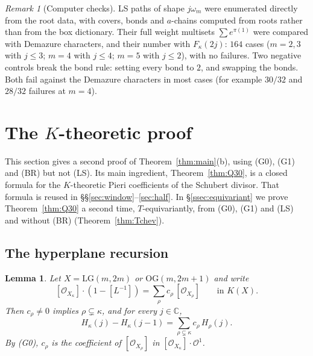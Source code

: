 \documentclass[11pt]{amsart}
\newtheorem{lemma}[theorem]{Lemma}
\theoremstyle{definition}
\theoremstyle{remark}
\newtheorem{remark}[theorem]{Remark}
\newcommand{\LG}{\mathrm{LG}}
\newcommand{\OG}{\mathrm{OG}}
\newcommand{\cO}{\mathcal{O}}
\newcommand{\C}{\mathbb{C}}
\begin{document}
\begin{remark}[Computer checks]\label{rem:ls-checks}
LS paths of shape $j\omega_m$ were enumerated directly from the root data, with covers, bonds
and $a$-chains computed from roots rather than from the box dictionary. Their full weight
multisets $\sum e^{\pi(1)}$ were compared with Demazure characters, and their number with
$F_\kappa(2j)$: $164$ cases ($m=2,3$ with $j\le3$; $m=4$ with $j\le4$; $m=5$ with $j\le2$), with no
failures. Two negative controls break the bond rule: setting every bond to $2$, and swapping
the bonds. Both fail against the Demazure characters in most cases (for example $30/32$ and
$28/32$ failures at $m=4$).
\end{remark}

\section{The \texorpdfstring{$K$}{K}-theoretic proof}\label{sec:ktheory}

This section gives a second proof of Theorem~\ref{thm:main}(b), using (G0), (G1) and (BR)
but not (LS). Its main ingredient, Theorem~\ref{thm:Q30}, is a closed formula for the
$K$-theoretic Pieri coefficients of the Schubert divisor. That formula is reused in
\S\S\ref{sec:window}--\ref{sec:half}. In \S\ref{ssec:equivariant} we prove
Theorem~\ref{thm:Q30} a second time, $T$-equivariantly, from (G0), (G1) and (LS) and without (BR)
(Theorem~\ref{thm:Tchev}).

\subsection{The hyperplane recursion}

\begin{lemma}\label{lem:hyperplane}
Let $X=\LG(m,2m)$ or $\OG(m,2m+1)$ and write
\[ [\cO_{X_\kappa}]\cdot(1-[L^{-1}])=\sum_\rho c_\rho\,[\cO_{X_\rho}]\qquad\text{in }K(X). \]
Then $c_\rho\ne0$ implies $\rho\subsetneq\kappa$, and for every $j\in\C$,
\begin{equation}\label{eq:hyperplane}
H_\kappa(j)-H_\kappa(j-1)=\sum_{\rho\subsetneq\kappa}c_\rho\,H_\rho(j).
\end{equation}
By (G0), $c_\rho$ is the coefficient of $[\cO_{X_\rho}]$ in $[\cO_{X_\kappa}]\cdot\cO^1$.
\end{lemma}
\end{document}
